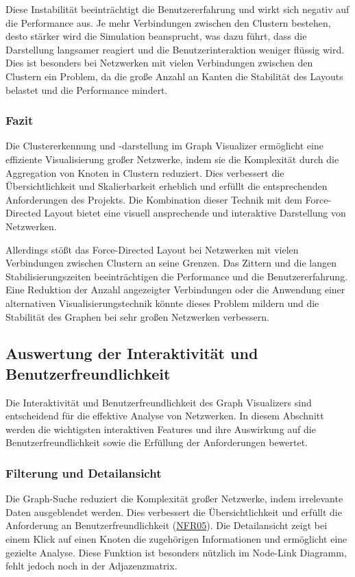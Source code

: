 Diese Instabilität beeinträchtigt die Benutzererfahrung und wirkt sich negativ auf die Performance aus. Je mehr Verbindungen zwischen den Clustern bestehen, desto stärker wird die Simulation beansprucht, was dazu führt, dass die Darstellung langsamer reagiert und die Benutzerinteraktion weniger flüssig wird. Dies ist besonders bei Netzwerken mit vielen Verbindungen zwischen den Clustern ein Problem, da die große Anzahl an Kanten die Stabilität des Layouts belastet und die Performance mindert.

\subsubsection{Fazit}

Die Clustererkennung und -darstellung im Graph Visualizer ermöglicht eine effiziente Visualisierung großer Netzwerke, indem sie die Komplexität durch die Aggregation von Knoten in Clustern reduziert. Dies verbessert die Übersichtlichkeit und Skalierbarkeit erheblich und erfüllt die entsprechenden Anforderungen des Projekts. Die Kombination dieser Technik mit dem Force-Directed Layout bietet eine visuell ansprechende und interaktive Darstellung von Netzwerken.

Allerdings stößt das Force-Directed Layout bei Netzwerken mit vielen Verbindungen zwischen Clustern an seine Grenzen. Das Zittern und die langen Stabilisierungszeiten beeinträchtigen die Performance und die Benutzererfahrung. Eine Reduktion der Anzahl angezeigter Verbindungen oder die Anwendung einer alternativen Visualisierungstechnik könnte dieses Problem mildern und die Stabilität des Graphen bei sehr großen Netzwerken verbessern.

\subsection{Auswertung der Interaktivität und Benutzerfreundlichkeit}

Die Interaktivität und Benutzerfreundlichkeit des Graph Visualizers sind entscheidend für die effektive Analyse von Netzwerken. In diesem Abschnitt werden die wichtigsten interaktiven Features und ihre Auswirkung auf die Benutzerfreundlichkeit sowie die Erfüllung der Anforderungen bewertet.

\subsubsection{Filterung und Detailansicht}

Die Graph-Suche reduziert die Komplexität großer Netzwerke, indem irrelevante Daten ausgeblendet werden. Dies verbessert die Übersichtlichkeit und erfüllt die Anforderung an Benutzerfreundlichkeit (\hyperref[NFR05]{NFR05}). Die Detailansicht zeigt bei einem Klick auf einen Knoten die zugehörigen Informationen und ermöglicht eine gezielte Analyse. Diese Funktion ist besonders nützlich im Node-Link Diagramm, fehlt jedoch noch in der Adjazenzmatrix.

